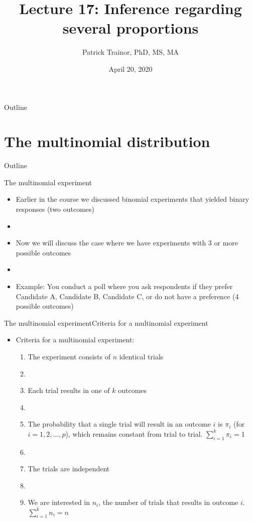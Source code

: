 \documentclass[xcolor=dvipsnames]{beamer}
\title[Lecture 17]{Lecture 17: Inference regarding several proportions}
\author[Patrick Trainor]{Patrick Trainor, PhD, MS, MA}
\institute[NMSU]{New Mexico State University}
\date{April 20, 2020}
\begin{document}
\begin{frame}
\maketitle
\end{frame}

\begin{frame}{Outline}
\tableofcontents[hideallsubsections]
\end{frame}

\section{The multinomial distribution}
\begin{frame}{Outline}
\tableofcontents[currentsection,subsectionstyle=show/shaded/hide]
\end{frame}

\begin{frame}{The multinomial experiment}
	\begin{itemize}
		\item Earlier in the course we discussed binomial experiments that yielded binary responses (two outcomes) \pause
		\item[]
		\item Now we will discuss the case where we have experiments with 3 or more possible outcomes \pause
		\item[]
		\item Example: You conduct a poll where you ask respondents if they prefer Candidate A, Candidate B, Candidate C, or do not have a preference (4 possible outcomes)
	\end{itemize}
\end{frame}

\begin{frame}{The multinomial experiment}{Criteria for a multinomial experiment}
	\begin{itemize}
		\item Criteria for a multinomial experiment: \pause
		\begin{enumerate}
			\item The experiment consists of $n$ identical trials \pause
			\item[]
			\item Each trial results in one of $k$ outcomes \pause
			\item[]
			\item The probability that a single trial will result in an outcome $i$ is $\pi_i$ (for $i=1, 2, \hdots, p$), which remains constant from trial to trial. $\sum_{i=1}^k \pi_i = 1$ \pause
			\item[]
			\item The trials are independent \pause
			\item[]
			\item We are interested in $n_i$, the number of trials that results in outcome $i$. $\sum_{i=1}^k n_i = n$ \pause
		\end{enumerate}
	\end{itemize}
\end{frame}
\end{document}
